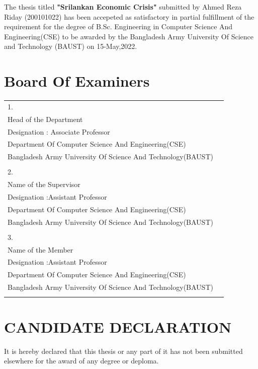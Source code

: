 \documentclass[a4paper,12pt]{article}
\begin{document}
\large
\justifying
The thesis titled \textbf{"Srilankan Economic Crisis"} submitted by Ahmed Reza Riday (200101022) has  been accepeted as satisfactory in partial fulfillment of the requirement for the degree of B.Sc. Engineering in Computer Science And Engineering(CSE) to be awarded by the Bangladesh Army University Of Science and Technology (BAUST) on 15-May,2022.

\newpage
\centering\section*{Board Of Examiners}
\begin{tabular}{ll}
\large
1.\\
Head of the Department\\
Designation : Associate Professor\\
Department Of Computer Science And Engineering(CSE)\\
Bangladesh Army University Of Science And Technology(BAUST)\\
\\
2.\\
Name of the Supervisor\\
Designation :Assistant Professor \\
Department Of Computer Science And Engineering(CSE)\\
Bangladesh Army University Of Science And Technology(BAUST)\\
\\
3.\\
Name of the Member\\
Designation :Assistant Professor \\
Department Of Computer Science And Engineering(CSE)\\
Bangladesh Army University Of Science And Technology(BAUST)\\
\\
\end{tabular}
\vfill
\newpage
\centering\section*{CANDIDATE DECLARATION}
\justifying
It is hereby declared that this thesis or any part of it has not been submitted elsewhere for the award of any degree or deploma.\\
\vspace{2cm}\newline
\end{document}
